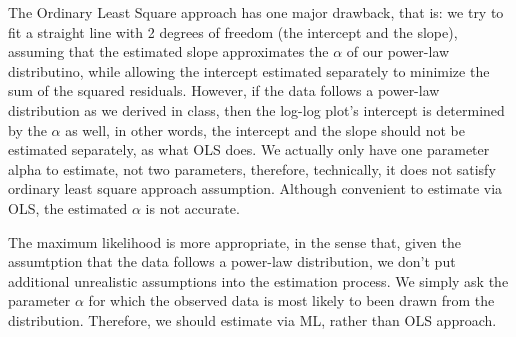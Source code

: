 \documentclass[11pt]{article} %
\begin{document}
\begin{itemize}
The Ordinary Least Square approach has one major drawback, that is: we try to fit a straight line with 2 degrees of freedom (the intercept and the slope), assuming that the estimated slope approximates the $\alpha$ of our power-law distributino, while allowing the intercept estimated separately to minimize the sum of the squared residuals. However, if the data follows a power-law distribution as we derived in class, then the log-log plot's intercept is determined by the $\alpha$ as well, in other words, the intercept and the slope should not be estimated separately, as what OLS does. We actually only have one parameter alpha to estimate, not two parameters, therefore, technically, it does not satisfy ordinary least square approach assumption. Although convenient to estimate via OLS, the estimated $\alpha$ is not accurate.

The maximum likelihood is more appropriate, in the sense that, given the assumtption that the data follows a power-law distribution, we don't put additional unrealistic assumptions into the estimation process. We simply ask the parameter $\alpha$ for which the observed data is most likely to been drawn from the distribution. Therefore, we should estimate via ML, rather than OLS approach.

\end{itemize}
\end{document}
